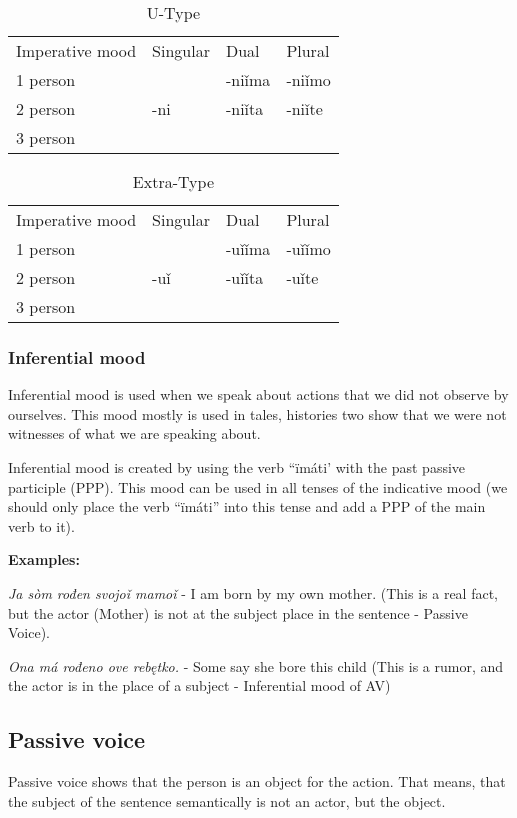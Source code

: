 \begin{table}[!htb]
	\caption{U-Type}
	\begin{tabular}{llll}
		Imperative mood & Singular & Dual & Plural \\
		1 person &  & -niǐma & -niǐmo \\
		2 person & -ni & -niǐta & -niǐte \\
		3 person &  &  & 
	\end{tabular}
\end{table}


\begin{table}[!htb]
	\caption{Extra-Type}
	\begin{tabular}{llll}
		Imperative mood & Singular & Dual & Plural \\
		1 person &  & -uǐǐma & -uǐǐmo \\
		2 person & -uǐ & -uǐǐta & -uǐte \\
		3 person &  &  & 
	\end{tabular}
\end{table}

\subsubsection{Inferential mood}

Inferential mood is used when we speak about actions that we did not observe by ourselves. This mood mostly is used in tales, histories two show that we were not witnesses of what we are speaking about.

Inferential mood is created by using the verb “ïmáti’ with the past passive participle (PPP). This mood can be used in all tenses of the indicative mood (we should only place the verb “ïmáti” into this tense and add a PPP of the main verb to it). 

\textbf{Examples:}

\textit{Ja sòm rođen svojoǐ mamoǐ} - I am born by my own mother. (This is a real fact, but the actor (Mother) is not at the subject place in the sentence - Passive Voice).

\textit{Ona má rođeno ove rebętko.} - Some say she bore this child (This is a rumor, and the actor is in the place of a subject - Inferential mood of AV)

\subsection{Passive voice}

Passive voice shows that the person is an object for the action. That means, that the subject of the sentence semantically is not an actor, but the object. 

